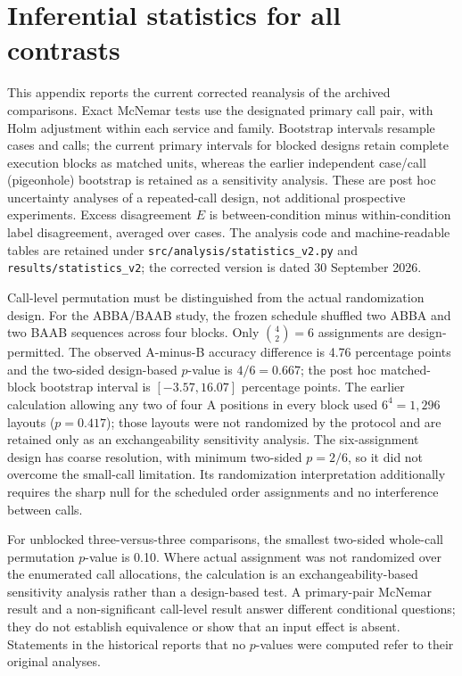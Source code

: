 \documentclass[11pt,a4paper]{article}
\begin{document}
\clearpage
\section{Inferential statistics for all contrasts}\label{app:stats}
This appendix reports the current corrected reanalysis of the archived comparisons. Exact McNemar tests use the designated primary call pair, with Holm adjustment within each service and family. Bootstrap intervals resample cases and calls; the current primary intervals for blocked designs retain complete execution blocks as matched units, whereas the earlier independent case/call (pigeonhole) bootstrap \citep{owen2007pigeonhole} is retained as a sensitivity analysis. These are post hoc uncertainty analyses of a repeated-call design, not additional prospective experiments. Excess disagreement $E$ is between-condition minus within-condition label disagreement, averaged over cases. The analysis code and machine-readable tables are retained under \nolinkurl{src/analysis/statistics_v2.py} and \nolinkurl{results/statistics_v2}; the corrected version is dated 30 September 2026.

Call-level permutation must be distinguished from the actual randomization design. For the ABBA/BAAB study, the frozen schedule shuffled two ABBA and two BAAB sequences across four blocks. Only $\binom{4}{2}=6$ assignments are design-permitted. The observed A-minus-B accuracy difference is 4.76 percentage points and the two-sided design-based $p$-value is $4/6=0.667$; the post hoc matched-block bootstrap interval is $[-3.57,16.07]$ percentage points. The earlier calculation allowing any two of four A positions in every block used $6^4=1{,}296$ layouts ($p=0.417$); those layouts were not randomized by the protocol and are retained only as an exchangeability sensitivity analysis. The six-assignment design has coarse resolution, with minimum two-sided $p=2/6$, so it did not overcome the small-call limitation. Its randomization interpretation additionally requires the sharp null for the scheduled order assignments and no interference between calls.

For unblocked three-versus-three comparisons, the smallest two-sided whole-call permutation $p$-value is 0.10. Where actual assignment was not randomized over the enumerated call allocations, the calculation is an exchangeability-based sensitivity analysis rather than a design-based test. A primary-pair McNemar result and a non-significant call-level result answer different conditional questions; they do not establish equivalence or show that an input effect is absent. Statements in the historical reports that no $p$-values were computed refer to their original analyses.
\end{document}
